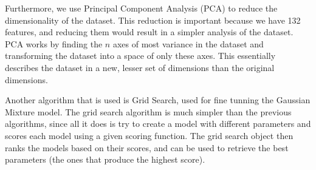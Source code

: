 \documentclass[journal,12pt,onecolumn,draftclsnofoot]{IEEEtran}  %
\begin{document}
Furthermore, we use Principal Component Analysis (PCA) to reduce the dimensionality of the dataset. This reduction is important because we have 132 features, and reducing them would result in a simpler analysis of the dataset. PCA works by finding the $n$ axes of most variance in the dataset and transforming the dataset into a space of only these axes. This essentially describes the dataset in a new, lesser set of dimensions than the original dimensions.

Another algorithm that is used is Grid Search, used for fine tunning the Gaussian Mixture model. The grid search algorithm is much simpler than the previous algorithms, since all it does is try to create a model with different parameters and scores each model using a given scoring function. The grid search object then ranks the models based on their scores, and can be used to retrieve the best parameters (the ones that produce the highest score).






\end{document}
